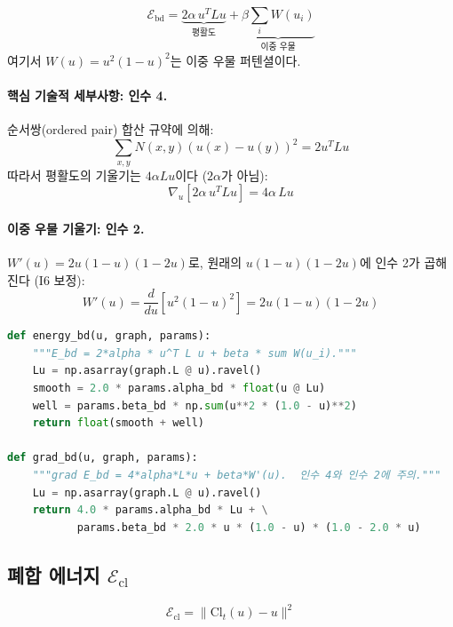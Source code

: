 \begin{equation}
    \mathcal{E}_{\mathrm{bd}} = \underbrace{2\alpha \, u^T L u}_{\text{평활도}} + \underbrace{\beta \sum_i W(u_i)}_{\text{이중 우물}}
\end{equation}
여기서 $W(u) = u^2(1-u)^2$는 이중 우물 퍼텐셜이다.

\paragraph{핵심 기술적 세부사항: 인수 4.}
순서쌍(ordered pair) 합산 규약에 의해:
\begin{equation}
    \sum_{x,y} N(x,y)(u(x)-u(y))^2 = 2u^T L u
\end{equation}
따라서 평활도의 기울기는 $4\alpha L u$이다 ($2\alpha$가 아님):
\begin{equation}
    \nabla_u [2\alpha \, u^T L u] = 4\alpha \, L u
    \label{eq:factor-4}
\end{equation}

\paragraph{이중 우물 기울기: 인수 2.}
$W'(u) = 2u(1-u)(1-2u)$로, 원래의 $u(1-u)(1-2u)$에 인수 2가 곱해진다 (I6 보정):
\begin{equation}
    W'(u) = \frac{d}{du}[u^2(1-u)^2] = 2u(1-u)(1-2u)
\end{equation}

\begin{lstlisting}[language=Python, caption={경계 에너지와 기울기 (energy.py)}]
def energy_bd(u, graph, params):
    """E_bd = 2*alpha * u^T L u + beta * sum W(u_i)."""
    Lu = np.asarray(graph.L @ u).ravel()
    smooth = 2.0 * params.alpha_bd * float(u @ Lu)
    well = params.beta_bd * np.sum(u**2 * (1.0 - u)**2)
    return float(smooth + well)

def grad_bd(u, graph, params):
    """grad E_bd = 4*alpha*L*u + beta*W'(u).  인수 4와 인수 2에 주의."""
    Lu = np.asarray(graph.L @ u).ravel()
    return 4.0 * params.alpha_bd * Lu + \
           params.beta_bd * 2.0 * u * (1.0 - u) * (1.0 - 2.0 * u)
\end{lstlisting}

\subsection{폐합 에너지 $\mathcal{E}_{\mathrm{cl}}$}

\begin{equation}
    \mathcal{E}_{\mathrm{cl}} = \|\mathrm{Cl}_t(u) - u\|^2
\end{equation}

